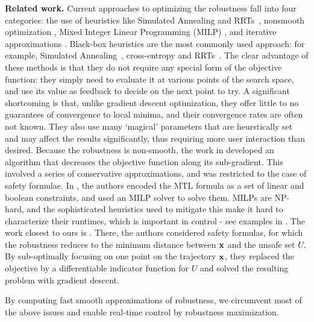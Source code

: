 \textbf{Related work.}
Current approaches to optimizing the robustness fall into four categories: 
the use of heuristics like Simulated Annealing and RRTs~\cite{NghiemSFIGP10hscc,AbbasF_HybridSA12,SankaranarayananF2012hscc,Dreossi15_RRTFalsification,Deshmukh15_IterativeApproaches}, 
nonsmooth optimization \cite{AbbasF13acc}, 
Mixed Integer Linear Programming (MILP) \cite{Raman14_MPCSTL}, 
and iterative approximations \cite{AbbasATVA11_LinFalsification,Abbas14_MTLDescent}.
Black-box heuristics are the most commonly used approach: for example, Simulated Annealing~\cite{NghiemSFIGP10hscc}, cross-entropy \cite{SankaranarayananF2012hscc} and RRTs~\cite{Dreossi15_RRTFalsification}.
The clear advantage of these methods is that they do not require any special form of the objective function: they simply need to evaluate it at various points of the search space, and use its value as feedback to decide on the next point to try.
A significant shortcoming is that, unlike gradient descent optimization, they offer little to no guarantees of convergence to local minima, and their convergence rates are often not known. 
They also use many `magical' parameters that are heurstically set and may affect the results significantly, thus requiring more user interaction than desired.
Because the robustness is non-smooth, the work in \cite{AbbasF13acc} developed an algorithm that decreases the objective function along its sub-gradient. 
This involved a series of conservative approximations, and was restricted to the case of safety formulae.
In \cite{Raman14_MPCSTL}, the authors encoded the MTL formula as a set of linear and boolean constraints, and used an MILP solver to solve them.
MILPs are NP-hard, and the sophisticated heuristics used to mitigate this make it hard to characterize their runtimes, which is important in control - see examples in \cite{Raman14_MPCSTL}.
The work closest to ours is \cite{AbbasATVA11_LinFalsification,Abbas14_MTLDescent}.
There, the authors considered safety formulas, for which the robustness reduces to the minimum distance between $\mathbf{x}$ and the unsafe set $U$.
By sub-optimally focusing on one point on the trajectory $\mathbf{x}$, they replaced the objective by a differentiable indicator function for $U$ and solved the resulting problem with gradient descent.

By computing fast smooth approximations of robustness, we circumvent most of the above issues and enable real-time control by robustness maximization.


